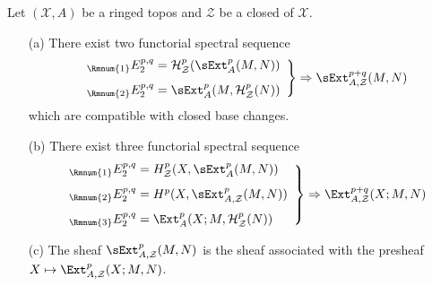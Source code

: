 \begin{proposition}\label{ringed topos sheaf Hom with support closed spectral sequence}
Let $(\mathcal{X},A)$ be a ringed topos and $\mathcal{Z}$ be a closed of $\mathcal{X}$.
\begin{enumerate}
    \item[(a)] There exist two functorial spectral sequence 
    \begin{equation}\label{ringed topos sheaf Hom with support closed spectral sequence-1}
    \left.\begin{array}{l}
    _{\Rmnum{1}}E_2^{p,q}=\mathcal{H}_\mathcal{Z}^p(\sExt_A^p(M,N))\\[8pt]
    _{\Rmnum{2}}E_2^{p,q}=\sExt_A^p(M,\mathcal{H}_\mathcal{Z}^p(N))    
    \end{array}\right\}
    \Rightarrow \sExt_{A,\mathcal{Z}}^{p+q}(M,N)
    \end{equation}
    which are compatible with closed base changes.
    \item[(b)] There exist three functorial spectral sequence 
    \begin{equation}\label{ringed topos sheaf Hom with support closed spectral sequence-2}
    \left.\begin{array}{l}
    _{\Rmnum{1}}E_2^{p,q}=H_\mathcal{Z}^p(X,\sExt_A^p(M,N))\\[8pt]
    _{\Rmnum{2}}E_2^{p,q}=H^p(X,\sExt_{A,\mathcal{Z}}^p(M,N))\\[8pt]
    _{\Rmnum{3}}E_2^{p,q}=\Ext_A^p(X;M,\mathcal{H}_\mathcal{Z}^p(N))
    \end{array}\right\}
    \Rightarrow \Ext_{A,\mathcal{Z}}^{p+q}(X;M,N)
    \end{equation}
    \item[(c)] The sheaf $\sExt_{A,\mathcal{Z}}^p(M,N)$ is the sheaf associated with the presheaf $X\mapsto\Ext_{A,\mathcal{Z}}^p(X;M,N)$.
\end{enumerate}
\end{proposition}
